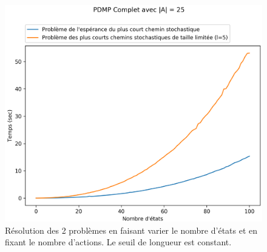 \documentclass[12pt,a4paper]{report}
\theoremstyle{definition}%
\theoremstyle{remark}
\begin{document}
\begin{figure}[H]
	\centering
	\captionsetup{justification=centering}
		\includegraphics[scale=0.5]{figures/solvers.png}
		\caption{\footnotesize Résolution des 2 problèmes en faisant varier le nombre d'états et en fixant le nombre d'actions. Le seuil de longueur est constant.}
		\label{graphic3}
\end{figure}
\end{document}
